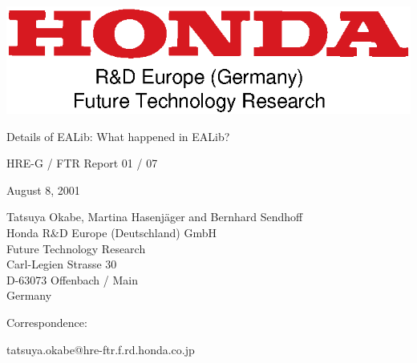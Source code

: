 \begin{center}
\includegraphics{honda-ftr.eps}

\vspace*{70pt}
{\LARGE
Details of EALib: What happened in EALib?}\\

\vspace*{10mm}

HRE-G / FTR Report 01 / 07\\

\vspace*{30mm}

August 8, 2001\\

\vspace*{30mm}

Tatsuya Okabe, Martina Hasenj\"{a}ger and Bernhard Sendhoff\\

Honda R\&D Europe (Deutschland) GmbH\\
Future Technology Research\\
Carl-Legien Strasse 30\\
D-63073 Offenbach / Main\\
Germany\\

\vspace*{30mm}

\end{center}

\noindent
Correspondence:

\noindent
tatsuya.okabe@hre-ftr.f.rd.honda.co.jp

